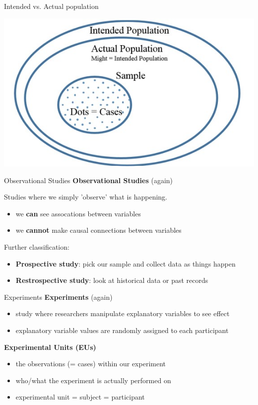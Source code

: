 \documentclass{beamer}
\begin{document}
\begin{frame}{Intended vs. Actual population}
\begin{center}
    \includegraphics[]{img/actual_intended_pop.jpg}
\end{center}
\end{frame}


\begin{frame}{Observational Studies}
\textbf{Observational Studies} (again)

Studies where we simply 'observe' what is happening.
\begin{itemize}
    \item we \textbf{can} see assocations between variables
    \item we \textbf{cannot} make causal connections between variables
\end{itemize} \vspace{6mm}

Further classification:
\begin{itemize}
    \item \textbf{Prospective study}: pick our sample and collect data as things happen
    \item \textbf{Restrospective study}: look at historical data or past records
\end{itemize}
\end{frame}



\begin{frame}{Experiments}
\textbf{Experiments} (again)
\begin{itemize}
    \item study where researchers manipulate explanatory variables to see effect
    \item explanatory variable values are randomly assigned to each participant
\end{itemize} \vspace{6mm}

\textbf{Experimental Units (EUs)}
\begin{itemize}
    \item the observations (= cases) within our experiment
    \item who/what the experiment is actually performed on
    \item experimental unit = subject = participant
\end{itemize}
\end{frame}
\end{document}
